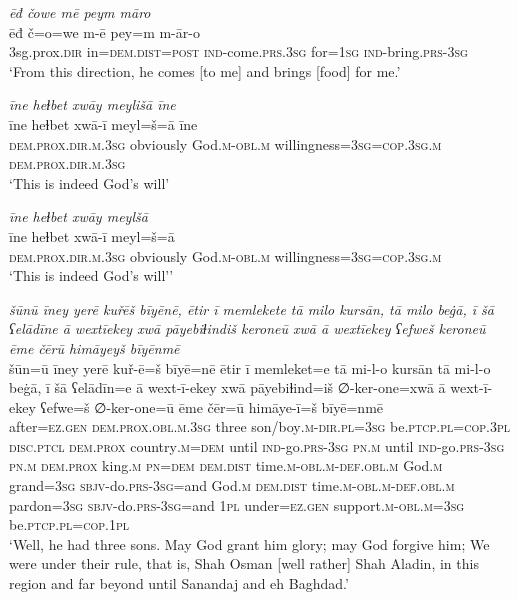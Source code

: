 \ea \label{PM.47}
\textit{ēđ čowe mē peym māro} \\ 
\gll ēđ č=o=we m-ē pey=m m-ār-o \\ 
 3sg.prox\textsc{.dir} in=\textsc{dem.dist}\textsc{=\textsc{post}} \textsc{ind-}come\textsc{.prs}\textsc{.3sg} for\textsc{=\textsc{1sg}} \textsc{ind-}bring\textsc{.prs}\textsc{-3sg} \\ 
\glt `From this direction, he  comes [to me] and brings [food] for me.'
\z 
 
\ea \label{PM.51}
\textit{īne heɫbet xwāy meylišā īne} \\ 
\gll īne heɫbet xwā-ī meyl=š=ā īne \\ 
 \textsc{dem.prox}\textsc{.dir}\textsc{.m}\textsc{.3sg} obviously God\textsc{.m}\textsc{-obl}\textsc{.m} willingness\textsc{=3sg}\textsc{=cop}\textsc{.3sg}\textsc{.m} \textsc{dem.prox}\textsc{.dir}\textsc{.m}\textsc{.3sg} \\ 
\glt `This is indeed God’s will'
\z 
 
\ea \label{PM.52}
\textit{īne heɫbet xwāy meylšā} \\ 
\gll īne heɫbet xwā-ī meyl=š=ā \\ 
 \textsc{dem.prox}\textsc{.dir}\textsc{.m}\textsc{.3sg} obviously God\textsc{.m}\textsc{-obl}\textsc{.m} willingness\textsc{=3sg}\textsc{=cop}\textsc{.3sg}\textsc{.m} \\ 
\glt `This is indeed God’s will’'
\z 
 
\ea \label{DG.4}
\textit{šūnū īney yerē kuřēš bīyēnē, ētir ī memlekete tā milo kursān, tā milo beġā, ī šā ʕelādīne ā wextīekey xwā pāyebiɫindiš keroneū xwā ā wextīekey ʕefweš keroneū ēme čērū himāyeyš bīyēnmē} \\ 
\gll šūn=ū īney yerē kuř-ē=š bīyē=nē ētir ī memleket=e tā mi-l-o kursān tā mi-l-o beġā, ī šā ʕelādīn=e ā wext-ī-ekey xwā pāyebiɫind=iš ∅-ker-one=xwā ā wext-ī-ekey ʕefwe=š ∅-ker-one=ū ēme čēr=ū himāye-ī=š bīyē=nmē \\ 
 after\textsc{=ez}\textsc{.gen} \textsc{dem.prox}\textsc{.obl}\textsc{.m}\textsc{.3sg} three son/boy\textsc{.m}\textsc{-dir}\textsc{.pl}\textsc{=3sg} be\textsc{.ptcp}\textsc{.pl}\textsc{=cop}\textsc{.3pl} \textsc{disc.ptcl} \textsc{dem.prox} country\textsc{.m}\textsc{=dem} until \textsc{ind-}go\textsc{.prs}\textsc{-3sg} \textsc{pn}\textsc{.m} until \textsc{ind-}go\textsc{.prs}\textsc{-3sg} \textsc{pn}\textsc{.m} \textsc{dem.prox} king\textsc{.m} \textsc{pn}\textsc{=dem} \textsc{dem.dist} time\textsc{.m}\textsc{-obl}\textsc{.m}\textsc{-def}\textsc{.obl}\textsc{.m} God\textsc{.m} grand\textsc{=3sg} \textsc{sbjv-}do\textsc{.prs}\textsc{-3sg}=and God\textsc{.m} \textsc{dem.dist} time\textsc{.m}\textsc{-obl}\textsc{.m}\textsc{-def}\textsc{.obl}\textsc{.m} pardon\textsc{=3sg} \textsc{sbjv-}do\textsc{.prs}\textsc{-3sg}=and \textsc{1pl} under\textsc{=ez}\textsc{.gen} support\textsc{.m}\textsc{-obl}\textsc{.m}\textsc{=3sg} be\textsc{.ptcp}\textsc{.pl}\textsc{=cop}\textsc{.1pl} \\ 
\glt `Well, he had three sons. May God grant him glory; may God forgive him; We were under their rule, that is, Shah Osman [well rather] Shah Aladin, in this region and far beyond until Sanandaj and eh Baghdad.'
\z 
 
